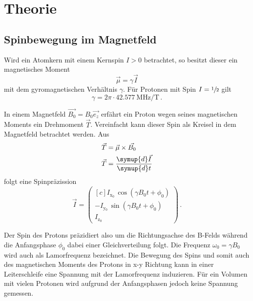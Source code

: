 \section{Theorie}

\subsection{Spinbewegung im Magnetfeld}

Wird ein Atomkern mit einem Kernspin $I>0$ betrachtet, so besitzt dieser ein magnetisches Moment
\begin{equation*}
  \vec{\mu} = \gamma \vec{I}
\end{equation*}
mit dem gyromagnetischen Verhältnis $\gamma$.
Für Protonen mit Spin $I = \sfrac{1}{2}$ gilt
\begin{equation*}
  \gamma = 2 \pi \cdot \SI{42.577}{\mega\hertz\per\tesla}\,. %
\end{equation*}

In einem Magnetfeld $\vec{B_0} = B_0 \vec{e_z}$ erfährt ein Proton wegen seines magnetischen Moments ein Drehmoment $\vec{T}$.
Vereinfacht kann dieser Spin als Kreisel in dem Magnetfeld betrachtet werden.
Aus
\begin{align*}
  \vec{T} &= \vec{\mu} \times \vec{B_0}  \\
  \vec{T} &= \frac{\symup{d}\vec{I}}{\symup{d}t}
\end{align*}
folgt eine Spinpräzission
\begin{equation}
  \vec{I} =
  \begin{pmatrix*}[c]
    I_{\text{x$_0$}} \, \cos(\gamma B_0 t + \phi_0) \\
    -I_{\text{y$_0$}} \, \sin(\gamma B_0 t + \phi_0) \\
    I_{\text{z$_0$}}
\end{pmatrix*}
 \, .
\end{equation}

Der Spin des Protons präzidiert also um die Richtungsachse des B-Felds während die Anfangsphase $\phi_0$ dabei einer Gleichverteilung folgt.
Die Frequenz $\omega_0 = \gamma B_0$ wird auch als Lamorfrequenz bezeichnet.
Die Bewegung des Spins und somit auch des magnetischen Moments des Protons in x-y Richtung kann in einer Leiterschleife eine Spannung mit der Lamorfrequenz induzieren.
Für ein Volumen mit vielen Protonen wird aufgrund der Anfangsphasen jedoch keine Spannung gemessen.


